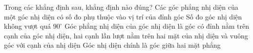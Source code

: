 %			
%			
%			
%			
%			
%			
%			
\begin{ex}%
	Trong các khẳng định sau, khẳng định nào đúng?
	\choice
	{Các góc phẳng nhị diện của một góc nhị diện có số đo phụ thuộc vào vị trí của đỉnh góc}
	{Số đo góc nhị diện không vượt quá $90^{\circ}$}
	{\True Góc phẳng nhị diện của góc nhị diện là góc có đỉnh nằm trên cạnh của góc nhị diện, hai cạnh lần lượt nằm trên hai mặt của nhị diện và vuông góc với cạnh của nhị diện}
	{Góc nhị diện chính là góc giữa hai mặt phẳng}
	\loigiai{
	}
\end{ex}

